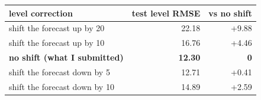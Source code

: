 \begin{tabular}{@{}p{3.4in}rr@{}}
\toprule
\textbf{level correction} & \textbf{test level RMSE} & \textbf{vs no shift} \\
\midrule
shift the forecast up by 20 & 22.18 & +9.88 \\
shift the forecast up by 10 & 16.76 & +4.46 \\
\textbf{no shift (what I submitted)} & \textbf{12.30} & \textbf{0} \\
shift the forecast down by 5 & 12.71 & +0.41 \\
shift the forecast down by 10 & 14.89 & +2.59 \\
\bottomrule
\end{tabular}
